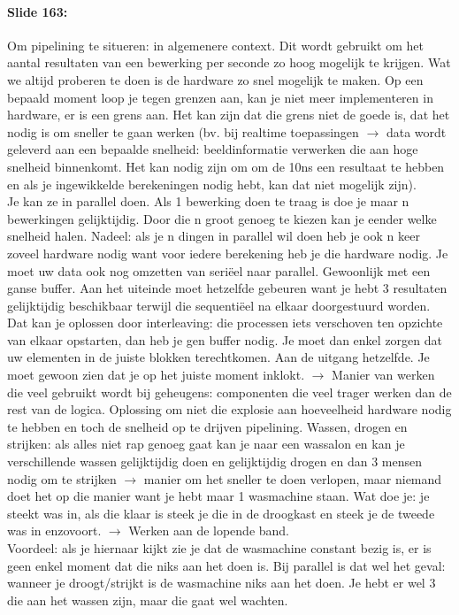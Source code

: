 \documentclass[10pt,a4paper]{book}
\begin{document}
\paragraph{Slide 163:} Om pipelining te situeren: in algemenere context. Dit wordt gebruikt om het aantal resultaten van een bewerking per seconde zo hoog mogelijk te krijgen. Wat we altijd proberen te doen is de hardware zo snel mogelijk te maken. Op een bepaald moment loop je tegen grenzen aan, kan je niet meer implementeren in hardware, er is een grens aan. Het kan zijn dat die grens niet de goede is, dat het nodig is om sneller te gaan werken (bv. bij realtime toepassingen $\rightarrow$ data wordt geleverd aan een bepaalde snelheid: beeldinformatie verwerken die aan hoge snelheid binnenkomt. Het kan nodig zijn om om de 10ns een resultaat te hebben en als je ingewikkelde berekeningen nodig hebt, kan dat niet mogelijk zijn).\\
Je kan ze in parallel doen. Als 1 bewerking doen te traag is doe je maar n bewerkingen gelijktijdig. Door die n groot genoeg te kiezen kan je eender welke snelheid halen. Nadeel: als je n dingen in parallel wil doen heb je ook n keer zoveel hardware nodig want voor iedere berekening heb je die hardware nodig. Je moet uw data ook nog omzetten van seri\"eel naar parallel. Gewoonlijk met een ganse buffer. Aan het uiteinde moet hetzelfde gebeuren want je hebt 3 resultaten gelijktijdig beschikbaar terwijl die sequenti\"eel na elkaar doorgestuurd worden. Dat kan je oplossen door interleaving: die processen iets verschoven ten opzichte van elkaar opstarten, dan heb je gen buffer nodig. Je moet dan enkel zorgen dat uw elementen in de juiste blokken terechtkomen. Aan de uitgang hetzelfde. Je moet gewoon zien dat je op het juiste moment inklokt. $\rightarrow$ Manier van werken die veel gebruikt wordt bij geheugens: componenten die veel trager werken dan de rest van de logica. Oplossing om niet die explosie aan hoeveelheid hardware nodig te hebben en toch de snelheid op te drijven pipelining. Wassen, drogen en strijken: als alles niet rap genoeg gaat kan je naar een wassalon en kan je verschillende wassen gelijktijdig doen en gelijktijdig drogen en dan 3 mensen nodig om te strijken $\rightarrow$ manier om het sneller te doen verlopen, maar niemand doet het op die manier want je hebt maar 1 wasmachine staan. Wat doe je: je steekt was in, als die klaar is steek je die in de droogkast en steek je de tweede was in enzovoort. $\rightarrow$ Werken aan de lopende band.\\
Voordeel: als je hiernaar kijkt zie je dat de wasmachine constant bezig is, er is geen enkel moment dat die niks aan het doen is. Bij parallel is dat wel het geval: wanneer je droogt/strijkt is de wasmachine niks aan het doen. Je hebt er wel 3 die aan het wassen zijn, maar die gaat wel wachten.\\
\end{document}
